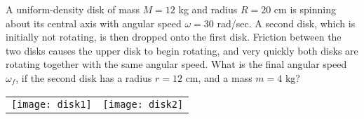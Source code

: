 
\question[20] A uniform-density disk of mass $M=12$ kg and radius $R=20$ cm is spinning about its central axis with angular speed $\omega=30$ rad/sec. A second disk, which is initially not rotating, is then dropped onto the first disk. Friction between the two disks causes the upper disk to begin rotating, and very quickly both disks are rotating together with the same angular speed. What is the final angular speed $\omega_f$, if the second disk has a radius $r=12$ cm, and a mass $m=4$ kg?

\begin{center}
	\begin{tabular}{cc}
		\texttt{[image: disk1]}&\texttt{[image: disk2]}
	\end{tabular}
\end{center}